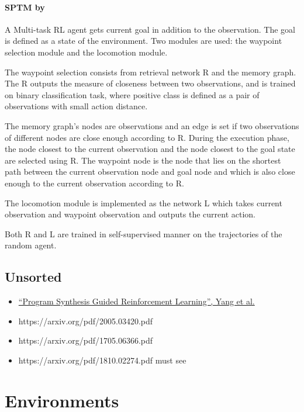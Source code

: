 \documentclass{article}
\begin{document}

\paragraph{SPTM by~\citet{savinov2018semiparametric}} %
\label{par:sptm}

A Multi-task RL agent gets current goal in addition to the observation. The goal is defined as a state of the environment. Two modules are used: the waypoint selection module and the locomotion module.

The waypoint selection consists from retrieval network R and the memory graph. The R outputs the measure of closeness between two observations, and is trained on binary classification task, where positive class is defined as a pair of observations with small action distance.

The memory graph's nodes are observations and an edge is set if two observations of different nodes are close enough according to R. During the execution phase, the node closest to the current observation and the node closest to the goal state are selected using R. The waypoint node is the node that lies on the shortest path between the current observation node and goal node and which is also close enough to the current observation according to R.

The locomotion module is implemented as the network L which takes current observation and waypoint observation and outputs the current action.

Both R and L are trained in self-supervised manner on the trajectories of the random agent.


\subsection{Unsorted}
\begin{itemize}
    \item \hyperlink{https://arxiv.org/pdf/2102.11137.pdf}{``Program Synthesis Guided Reinforcement Learning'', Yang et al.} 
    \item https://arxiv.org/pdf/2005.03420.pdf
    \item https://arxiv.org/pdf/1705.06366.pdf
    \item https://arxiv.org/pdf/1810.02274.pdf must see
\end{itemize}

\section{Environments} %
\label{sec:environments}
\end{document}
